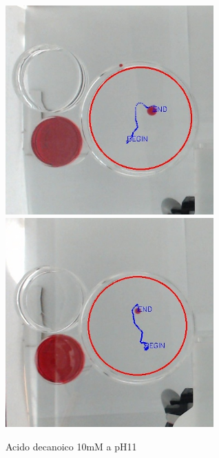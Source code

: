 \begin{figure}[h]
	\centering
   		{\includegraphics[width=8cm]{immagini/10mMpH11-2.jpg}}
 	\hspace{2mm}   	
		{\includegraphics[width=8cm]{immagini/10mMpH11-1.jpg}}
	\caption{Acido decanoico 10mM a pH11}
\end{figure}   
